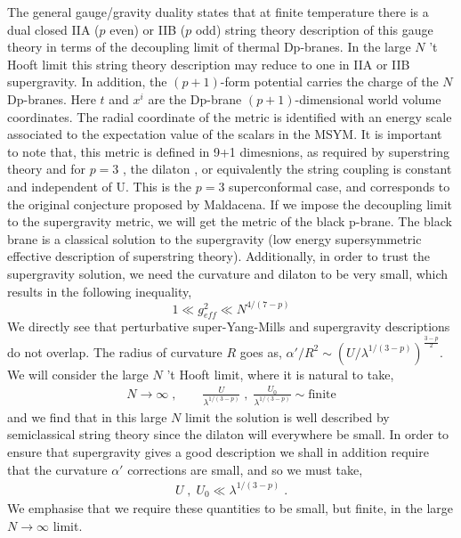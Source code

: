The general gauge/gravity duality \cite{Itzhaki:1998dd} 
states that at finite temperature there is a dual closed IIA ($p$ even) or IIB ($p$ odd)
string theory description of this gauge theory in terms of the decoupling limit of thermal Dp-branes. 
 In the large $N$ 't Hooft limit this string theory description may reduce to one in IIA or IIB supergravity. 
In addition, the $(p+1)$-form potential carries the charge of the $N$ Dp-branes. Here $t$ and $x^i$ 
are the Dp-brane $(p+1)$-dimensional world volume coordinates. The radial coordinate of the metric 
is identified with an energy scale associated to the expectation value of the scalars in the MSYM. 
It is important to note that, this metric is defined in 9+1 dimesnions, as required by superstring theory and 
for $p=3$ , the dilaton , or equivalently the string coupling is constant and independent of U.
This is the $p=3$ superconformal case, and corresponds to the original conjecture proposed by Maldacena. 
If we impose the decoupling limit to the supergravity metric, we will get the metric of the black p-brane. 
The black brane is a classical solution to the supergravity (low energy supersymmetric effective 
description of superstring theory). Additionally, in 
order to trust the supergravity solution, we need the curvature and 
dilaton to be very small, which results in the following inequality, 
\begin{equation}
1 \ll g_{eff}^{2} \ll N^{4/(7-p)} 
\end{equation}
We directly see that perturbative super-Yang-Mills and supergravity descriptions do not overlap. 
The radius of curvature $R$ goes as,
$\alpha' /R^2 \sim \left( U / \lambda^{1/(3-p) } \right)^{\frac{3-p}{2} }$. 
We will consider the large $N$ 't Hooft limit, where it is natural to take,
\begin{eqnarray}
N \to \infty \; , \qquad \frac{U}{\lambda^{1/(3-p)}}  \; , \; \frac{U_0}{\lambda^{1/(3-p)}}  \sim \mathrm{finite}
\end{eqnarray}
and we find that in this large $N$ limit the solution is well described by 
semiclassical string theory since the dilaton will everywhere be small. In order to ensure that supergravity 
gives a good description we shall in addition require that the curvature $\alpha'$ corrections are small, 
and so we must take,
\begin{eqnarray}
U  \; , \; U_0 \ll \lambda^{1/(3-p)} \; .
\end{eqnarray}
We emphasise that we require these quantities to be small, but finite, in the large $N \to \infty$ limit. 

